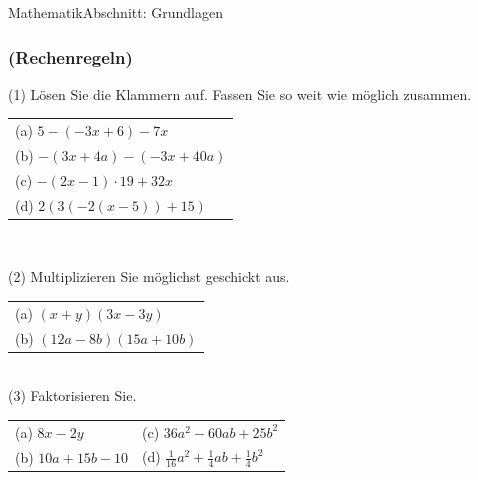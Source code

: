 \documentclass[11pt,twocolumn,oneside,openany,headings=optiontotoc,11pt,numbers=noenddot]{article}
\begin{document}
\begin{worksheet}{}{Mathematik}{Abschnitt: Grundlagen}
		\subsubsection*{(Rechenregeln)}
		(1) Lösen Sie die Klammern auf. Fassen Sie so weit wie möglich zusammen.\\
		\begin{tabularx}{0.5\textwidth}{X}
			(a) \(5-(-3x+6)-7x\)\\
			(b) \(-(3x+4a)-(-3x+40a)\)\\
			(c) \(-(2x-1)\cdot{}19 + 32x\)\\
			(d) \(2(3(-2(x-5))+15)\)
		\end{tabularx}\\
		\par\bigskip\noindent
		(2) Multiplizieren Sie möglichst geschickt aus.\\
		\begin{tabularx}{0.5\textwidth}{X}
			(a) \((x+y)(3x-3y)\)\\
			(b) \((12a-8b)(15a+10b)\)
		\end{tabularx}\\
		\newpage
		(3) Faktorisieren Sie.\\
		\begin{tabularx}{0.5\textwidth}{XX}
			(a) \(8x-2y\) & (c) \(36a^2 - 60ab +25b^2\)\\
			(b) \(10a + 15b -10\) & (d) \(\frac{1}{16}a^2 + \frac{1}{4}ab + \frac{1}{4}b^2\)
		\end{tabularx}

\end{worksheet}
\end{document}
